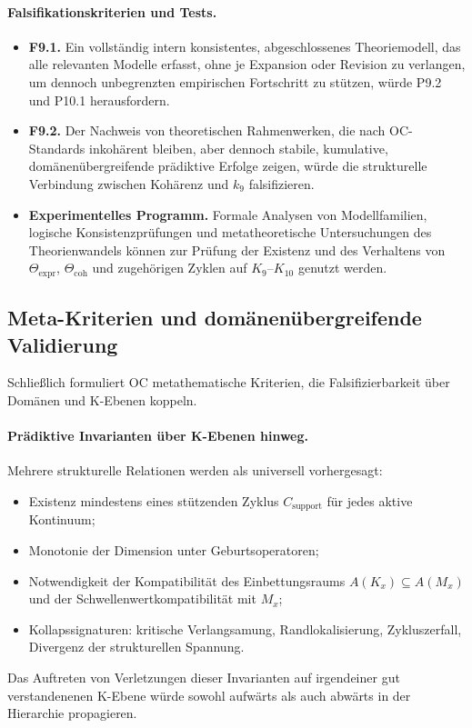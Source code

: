 {\paragraph{Falsifikationskriterien und Tests.}
\begin{itemize}
  \item \textbf{F9.1.}
        Ein vollständig intern konsistentes, abgeschlossenes Theoriemodell,
das alle relevanten Modelle erfasst, ohne je Expansion oder Revision zu verlangen,
um dennoch unbegrenzten empirischen Fortschritt zu stützen, würde
        P9.2 und P10.1 herausfordern.
  \item \textbf{F9.2.}
        Der Nachweis von theoretischen Rahmenwerken, die nach OC-Standards
        inkohärent bleiben, aber dennoch stabile, kumulative,
domänenübergreifende prädiktive Erfolge zeigen, würde die strukturelle Verbindung
        zwischen Kohärenz und \(k_9\) falsifizieren.
  \item \textbf{Experimentelles Programm.}
        Formale Analysen von Modellfamilien, logische Konsistenzprüfungen und
        metatheoretische Untersuchungen des Theorienwandels können zur Prüfung der
        Existenz und des Verhaltens von
        \(\Theta_{\mathrm{expr}}\), \(\Theta_{\mathrm{coh}}\) und zugehörigen
        Zyklen auf \(K_9\)–\(K_{10}\) genutzt werden.
\end{itemize}

\subsection{Meta-Kriterien und domänenübergreifende Validierung}

Schließlich formuliert OC metathematische Kriterien, die Falsifizierbarkeit über
Domänen und K-Ebenen koppeln.

\paragraph{Prädiktive Invarianten über K-Ebenen hinweg.}
Mehrere strukturelle Relationen werden als universell vorhergesagt:
\begin{itemize}
  \item Existenz mindestens eines stützenden Zyklus \(C_{\mathrm{support}}\)
        für jedes aktive Kontinuum;
  \item Monotonie der Dimension unter Geburtsoperatoren;
  \item Notwendigkeit der Kompatibilität des Einbettungsraums
        \(A(K_x)\subseteq A(M_x)\) und der Schwellenwertkompatibilität mit \(M_x\);
  \item Kollapssignaturen: kritische Verlangsamung, Randlokalisierung,
        Zykluszerfall, Divergenz der strukturellen Spannung.
\end{itemize}
Das Auftreten von Verletzungen dieser Invarianten auf irgendeiner gut
verstandenenen K-Ebene würde sowohl aufwärts als auch abwärts in der Hierarchie
propagieren.

}
